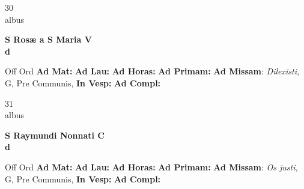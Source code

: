 \documentclass[10pt, openany]{book}
\begin{document}
    \begin{center}
        \begin{minipage}{3.5in}
            \vspace{2em}
            \begin{minipage}{0.5in}
                {\Huge 30} \\
                {\normalsize albus}
            \end{minipage}
            \begin{minipage}{3.0in}
                \textbf{ \large S Rosæ a S Maria V \\
                \textnormal{\normalsize d}}

            \end{minipage}
            \begin{justify}Off Ord
                \textbf{Ad Mat: }
                \textbf{Ad Lau: }
                \textbf{Ad Horas: }
                \textbf{Ad Primam: }\textbf{Ad Missam}: \textit{Dilexisti,} G, Pre Communis, 
                \textbf{In Vesp: }
                \textbf{Ad Compl: }
            \end{justify}
        \end{minipage}
    \end{center}

    \begin{center}
        \begin{minipage}{3.5in}
            \vspace{2em}
            \begin{minipage}{0.5in}
                {\Huge 31} \\
                {\normalsize albus}
            \end{minipage}
            \begin{minipage}{3.0in}
                \textbf{ \large S Raymundi Nonnati C \\
                \textnormal{\normalsize d}}

            \end{minipage}
            \begin{justify}Off Ord
                \textbf{Ad Mat: }
                \textbf{Ad Lau: }
                \textbf{Ad Horas: }
                \textbf{Ad Primam: }\textbf{Ad Missam}: \textit{Os justi,} G, Pre Communis, 
                \textbf{In Vesp: }
                \textbf{Ad Compl: }
            \end{justify}
        \end{minipage}
    \end{center}
\end{document}

